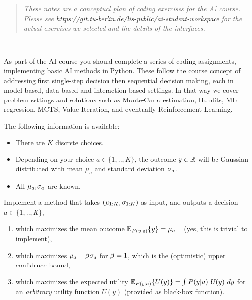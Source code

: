 

\renewcommand{\course}{Artificial Intelligence}
\renewcommand{\coursepicture}{course_ai}
\renewcommand{\coursedate}{Summer 2023}
\renewcommand{\exnum}{Plan of Coding Assignments}
\renewcommand{\teacher}{Marc Toussaint}

\exercises

\newcommand{\notes}[1]{\medskip{\scriptsize #1}\medskip}

\exercisestitle


\begin{quote}
\emph{These notes are a conceptual plan of coding exercises for the AI course. Please see \url{https://git.tu-berlin.de/lis-public/ai-student-workspace} for the actual exercises we selected and the details of the interfaces.}
\end{quote}

~

As part of the AI course you should complete a series of coding assignments, implementing basic AI methods in Python. These follow the course concept of addressing first single-step decision then sequential decision making, each in model-based, data-based and interaction-based settings. In that way we cover problem settings and solutions such as Monte-Carlo estimation, Bandits, ML regression, MCTS, Value Iteration, and eventually Reinforcement Learning.

{\small\tableofcontents}




The following information is available:
\begin{itemize}
\item There are $K$ discrete choices.
\item Depending on your choice $a\in\{1,..,K\}$, the outcome $y\in\RRR$ will be Gaussian distributed with mean $\mu_a$ and standard deviation $\s_a$.
\item All $\mu_a,\s_a$ are known.
\end{itemize}

Implement a method that takes $(\mu_{1:K}, \s_{1:K})$ as input, and outputs a decision $a\in\{1,..,K\}$,
\begin{enumerate}
\item which maximizes the mean outcome $\Exp[P(y|a)]{y} = \mu_a$ ~ (yes, this is trivial to implement),
\item which maximizes $\mu_a + \b \s_a$ for $\b=1$, which is the (optimistic) upper confidence bound,
\item which maximizes the expected utility $\Exp[P(y|a)]{U(y)} = \int P(y|a)~ U(y)~ dy$ for an \emph{arbitrary} utility function $U(y)$ (provided as black-box function).
\end{enumerate}

